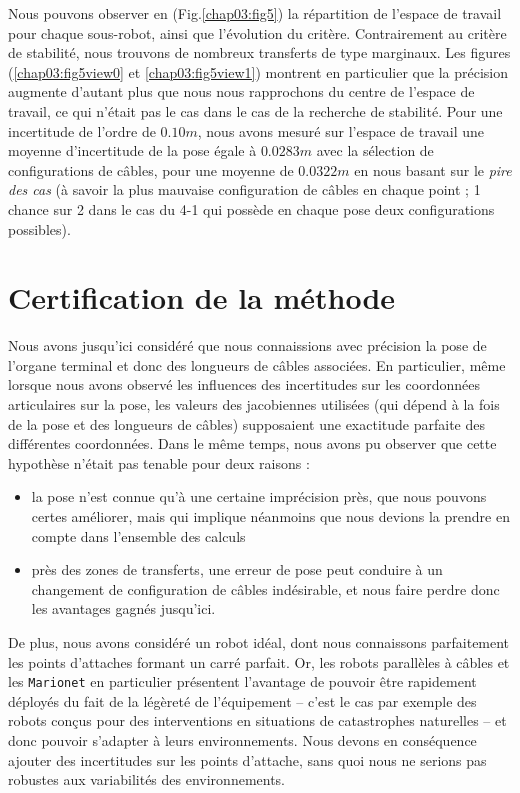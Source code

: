 Nous pouvons observer en (Fig.\ref{chap03:fig5}) la r\'epartition de l'espace 
de travail pour chaque sous-robot, ainsi que l'\'evolution du crit\`ere. 
Contrairement au crit\`ere de stabilit\'e, nous trouvons de nombreux transferts 
de type marginaux. Les figures (\ref{chap03:fig5view0} et 
\ref{chap03:fig5view1}) montrent en particulier que la pr\'ecision augmente 
d'autant plus que nous nous rapprochons du centre de l'espace de travail, ce qui 
n'\'etait pas le cas dans le cas de la recherche de stabilit\'e. Pour une 
incertitude de l'ordre de $0.10m$, nous avons mesur\'e sur l'espace de travail 
une moyenne d'incertitude de la pose \'egale \`a $0.0283m$ avec la s\'election 
de configurations de c\^ables, pour une moyenne de $0.0322m$ en nous basant sur 
le {\it pire des cas} (\`a savoir la plus mauvaise configuration de c\^ables en 
chaque point ; 1 chance sur 2 dans le cas du 4-1 qui poss\`ede en chaque pose 
deux configurations possibles).

\section{Certification de la m\'ethode}

Nous avons jusqu'ici consid\'er\'e que nous connaissions avec pr\'ecision la 
pose de l'organe terminal et donc des longueurs de c\^ables associ\'ees. En 
particulier, m\^eme lorsque nous avons observ\'e les influences des 
incertitudes sur les coordonn\'ees articulaires sur la pose, les 
valeurs des jacobiennes utilis\'ees (qui d\'epend \`a la fois de la pose et des 
longueurs de c\^ables) supposaient une exactitude parfaite des diff\'erentes 
coordonn\'ees. Dans le m\^eme temps, nous avons pu observer que cette 
hypoth\`ese n'\'etait pas tenable pour deux raisons :
\begin{itemize}
 \item la pose n'est connue qu'\`a une certaine impr\'ecision pr\`es, que nous 
pouvons certes am\'eliorer, mais qui implique n\'eanmoins que nous devions la 
prendre en compte dans l'ensemble des calculs
\item pr\`es des zones de transferts, une erreur de pose peut conduire \`a un 
changement de configuration de c\^ables ind\'esirable, et nous faire perdre 
donc 
les avantages gagn\'es jusqu'ici.
\end{itemize}

De plus, nous avons consid\'er\'e un robot id\'eal, dont nous connaissons 
parfaitement les points d'attaches formant un carr\'e parfait. Or, les robots 
parall\`eles \`a c\^ables et les {\tt Marionet} en particulier pr\'esentent 
l'avantage de pouvoir \^etre rapidement d\'eploy\'es du fait de la 
l\'eg\`eret\'e de l'\'equipement -- c'est le cas par exemple des robots con\c 
cus pour des interventions en situations de catastrophes naturelles -- et donc 
pouvoir s'adapter \`a leurs environnements. Nous devons en cons\'equence 
ajouter des incertitudes sur les points d'attache, sans quoi nous ne serions 
pas robustes aux variabilit\'es des environnements.

